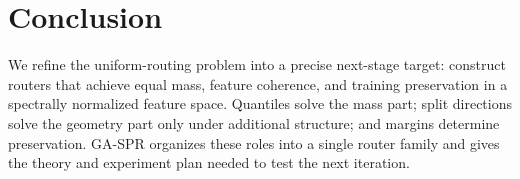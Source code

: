 \documentclass{article}
\begin{document}
\section{Conclusion}

We refine the uniform-routing problem into a precise next-stage target:
construct routers that achieve equal mass, feature coherence, and training
preservation in a spectrally normalized feature space.  Quantiles solve the mass
part; split directions solve the geometry part only under additional structure;
and margins determine preservation.  GA-SPR organizes these roles into a single
router family and gives the theory and experiment plan needed to test the next
iteration.



\end{document}
